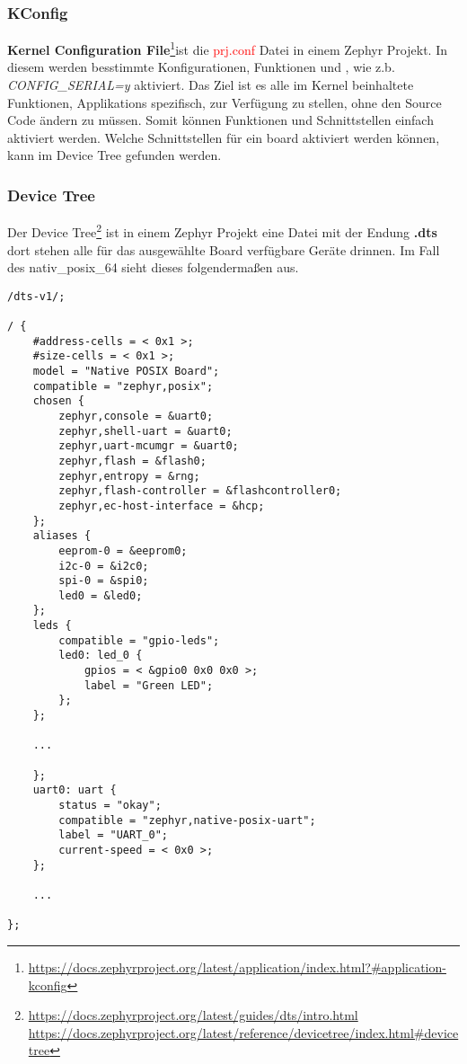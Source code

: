     \subsubsection{KConfig}
    \textbf{Kernel Configuration File}\footnote{\url{https://docs.zephyrproject.org/latest/application/index.html?\#application-kconfig}}ist die \textcolor{red}{prj.conf} Datei in einem 
    Zephyr Projekt. In diesem werden besstimmte Konfigurationen, Funktionen und , wie z.b. \textit{CONFIG\_SERIAL=y} aktiviert. 
    Das Ziel ist es alle im Kernel beinhaltete Funktionen, Applikations spezifisch, zur Verfügung zu stellen, ohne den Source Code ändern zu müssen. 
    Somit können Funktionen und Schnittstellen einfach aktiviert werden. 
    Welche Schnittstellen für ein board aktiviert werden können, kann im Device Tree gefunden werden. 

\newpage
    \subsubsection{Device Tree}
    Der Device Tree\footnote{\url{https://docs.zephyrproject.org/latest/guides/dts/intro.html}\\\url{https://docs.zephyrproject.org/latest/reference/devicetree/index.html\#devicetree}} ist 
    in einem Zephyr Projekt eine Datei mit der Endung \textbf{.dts} dort stehen alle für das ausgewählte Board verfügbare Geräte drinnen.
    Im Fall des nativ\_posix\_64 sieht dieses folgendermaßen aus. 
    \begin{lstlisting}[style=StyleC, captionpos=b, caption=West Beispiel, label=West Beispiel]
/dts-v1/;

/ {
    #address-cells = < 0x1 >;
    #size-cells = < 0x1 >;
    model = "Native POSIX Board";
    compatible = "zephyr,posix";
    chosen {
        zephyr,console = &uart0;
        zephyr,shell-uart = &uart0;
        zephyr,uart-mcumgr = &uart0;
        zephyr,flash = &flash0;
        zephyr,entropy = &rng;
        zephyr,flash-controller = &flashcontroller0;
        zephyr,ec-host-interface = &hcp;
    };
    aliases {
        eeprom-0 = &eeprom0;
        i2c-0 = &i2c0;
        spi-0 = &spi0;
        led0 = &led0;
    };
    leds {
        compatible = "gpio-leds";
        led0: led_0 {
            gpios = < &gpio0 0x0 0x0 >;
            label = "Green LED";
        };
    };

    ...

    };
    uart0: uart {
        status = "okay";
        compatible = "zephyr,native-posix-uart";
        label = "UART_0";
        current-speed = < 0x0 >;
    };
    
    ...

};    
    \end{lstlisting}


